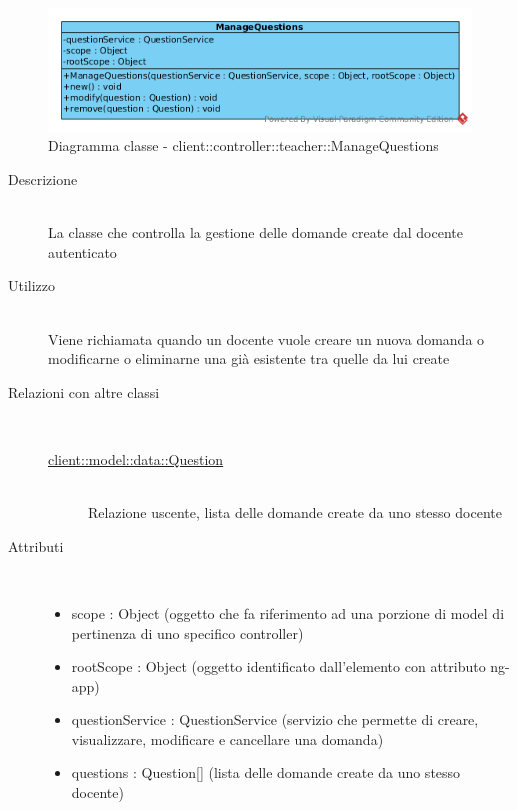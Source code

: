 \vspace{0.5cm}
\hypertarget{client::controller::teacher::ManageQuestions}{}
\begin{center}
			\begin{figure}[H]
				\centering \includegraphics[scale=4, max width=\textwidth, max height=\myheight]{../img/diagrammiClassi/client/controller/teacher/ManageQuestions.png}
				\caption{Diagramma classe - client::controller::teacher::ManageQuestions}
			\end{figure}
		\end{center}\begin{description}
\item[Descrizione] \hfill \\
 La classe che controlla la gestione delle domande create dal docente autenticato
\item[Utilizzo] \hfill \\
 Viene richiamata quando un docente vuole creare un nuova domanda o modificarne o eliminarne una già esistente tra quelle da lui create
\item[Relazioni con altre classi] \hfill \\
 \vspace{-7mm}
\begin{description}
\item[\hyperlink{client::model::data::Question}{client::model::data::Question}] \hfill \\
 Relazione uscente, lista delle domande create da uno stesso docente
\end{description}

\item[Attributi] \hfill \\
 \vspace{-7mm}
\begin{itemize}
\item scope : Object (oggetto che fa riferimento ad una porzione di model di pertinenza di uno specifico controller)
\item rootScope : Object (oggetto identificato dall’elemento con attributo ng-app)
\item questionService : QuestionService (servizio che permette di creare, visualizzare, modificare e cancellare una domanda)
\item questions  : Question[] (lista delle domande create da uno stesso docente)
\end{itemize}


\end{description}
